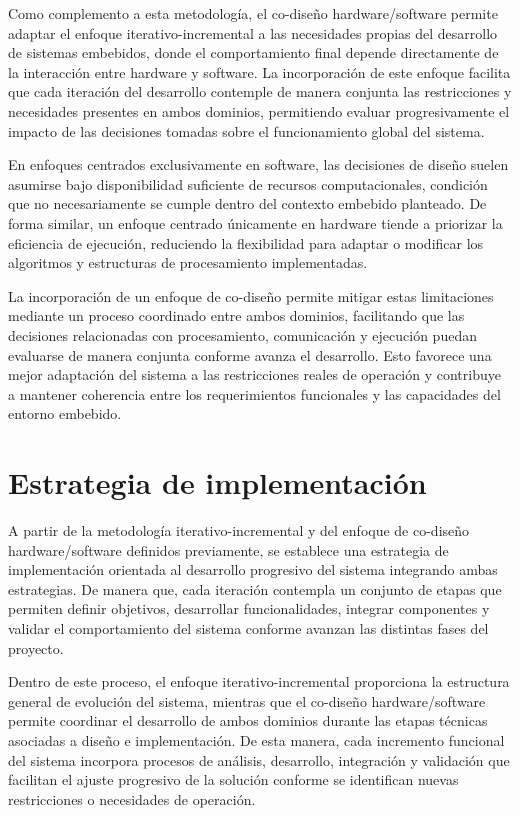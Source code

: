 Como complemento a esta metodología, el co-diseño hardware/software permite adaptar el enfoque iterativo-incremental a las necesidades propias del desarrollo de sistemas embebidos, donde el comportamiento final depende directamente de la interacción entre hardware y software. La incorporación de este enfoque facilita que cada iteración del desarrollo contemple de manera conjunta las restricciones y necesidades presentes en ambos dominios, permitiendo evaluar progresivamente el impacto de las decisiones tomadas sobre el funcionamiento global del sistema.

En enfoques centrados exclusivamente en software, las decisiones de diseño suelen asumirse bajo disponibilidad suficiente de recursos computacionales, condición que no necesariamente se cumple dentro del contexto embebido planteado. De forma similar, un enfoque centrado únicamente en hardware tiende a priorizar la eficiencia de ejecución, reduciendo la flexibilidad para adaptar o modificar los algoritmos y estructuras de procesamiento implementadas.

La incorporación de un enfoque de co-diseño permite mitigar estas limitaciones mediante un proceso coordinado entre ambos dominios, facilitando que las decisiones relacionadas con procesamiento, comunicación y ejecución puedan evaluarse de manera conjunta conforme avanza el desarrollo. Esto favorece una mejor adaptación del sistema a las restricciones reales de operación y contribuye a mantener coherencia entre los requerimientos funcionales y las capacidades del entorno embebido.
\section{Estrategia de implementación}

A partir de la metodología iterativo-incremental y del enfoque de co-diseño hardware/software definidos previamente, se establece una estrategia de implementación orientada al desarrollo progresivo del sistema integrando ambas estrategias. De manera que, cada iteración contempla un conjunto de etapas que permiten definir objetivos, desarrollar funcionalidades, integrar componentes y validar el comportamiento del sistema conforme avanzan las distintas fases del proyecto.

Dentro de este proceso, el enfoque iterativo-incremental proporciona la estructura general de evolución del sistema, mientras que el co-diseño hardware/software permite coordinar el desarrollo de ambos dominios durante las etapas técnicas asociadas a diseño e implementación. De esta manera, cada incremento funcional del sistema incorpora procesos de análisis, desarrollo, integración y validación que facilitan el ajuste progresivo de la solución conforme se identifican nuevas restricciones o necesidades de operación.


